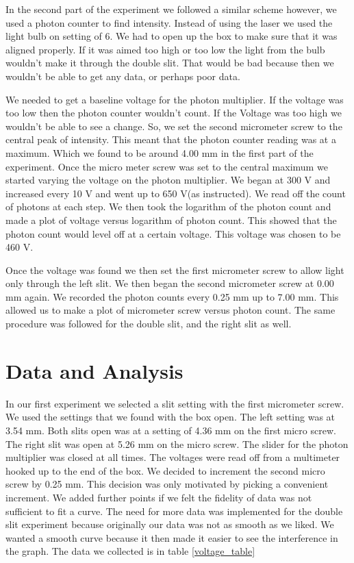 \documentclass[12pt letterpaper]{article}
\begin{document}
In the second part of the experiment we followed a similar scheme however, we used a photon counter to find intensity. Instead of using the laser we used the light bulb on setting of 6. We had to open up the box to make sure that it was aligned properly. If it was aimed too high or too low the light from the bulb wouldn't make it through the double slit. That would be bad because then we wouldn't be able to get any data, or perhaps poor data. 

We needed to get a baseline voltage for the photon multiplier. If the voltage was too low then the photon counter wouldn't count. If the Voltage was too high we wouldn't be able to see a change. So, we set the second micrometer screw to the central peak of intensity. This meant that the photon counter reading was at a maximum.  Which we found to be around 4.00 mm in the first part of the experiment. Once the micro meter screw was set to the central maximum we started varying the voltage on the photon multiplier. We began at 300 V and increased every 10 V and went up to 650 V(as instructed). We read off the count of photons at each step. We then took the logarithm of the photon count and made a plot of voltage versus logarithm of photon count. This showed that the photon count would level off at a certain voltage. This voltage was chosen to be 460 V. 

Once the voltage was found we then set the first micrometer screw to allow light only through the left slit. We then began the second micrometer screw at 0.00 mm again. We recorded the photon counts every 0.25 mm up to 7.00 mm. This allowed us to make a plot of micrometer screw versus photon count. The same procedure was followed for the double slit, and the right slit as well. 


\section*{Data and Analysis}

In our first experiment we selected a slit setting with the first micrometer screw. We used the settings that we found with the box open. The left setting was at 3.54 mm. Both slits open was at a setting of 4.36 mm on the first micro screw. The right slit was open at 5.26 mm on the micro screw. The slider for the photon multiplier was closed at all times. The voltages were read off from a multimeter hooked up to the end of the box. We decided to increment the second micro screw by 0.25 mm. This decision was only motivated by picking a convenient increment. We added further points if we felt the fidelity of data was not sufficient to fit a curve. The need for more data was implemented for the double slit experiment because originally our data was not as smooth as we liked. We wanted a smooth curve because it then made it easier to see the interference in the graph. The data we collected is in table \ref{voltage_table}
\end{document}
